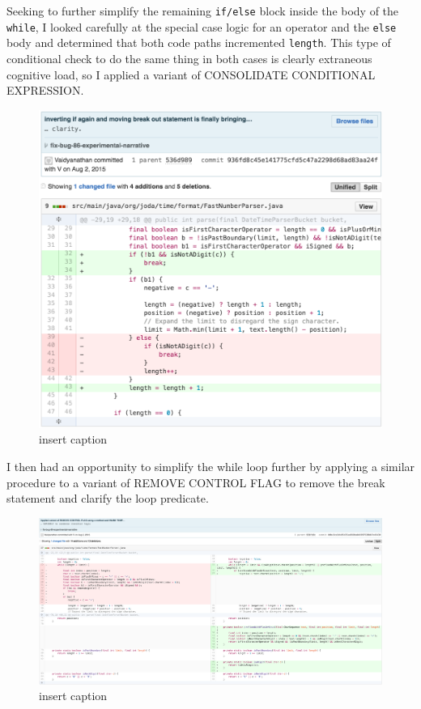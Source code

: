 Seeking to further simplify the remaining \texttt{if/else} block inside the body of the \texttt{while}, I looked carefully at the special case logic for an operator and the \texttt{else} body and determined that both code paths incremented \texttt{length}. This type of conditional check to do the same thing in both cases is clearly extraneous cognitive load, so I applied a variant of CONSOLIDATE CONDITIONAL EXPRESSION.

\begin{figure}[H]
	\centering
	\includegraphics[width=\linewidth]{code16}
	\caption{insert caption}
\end{figure}

I then had an opportunity to simplify the while loop further by applying a similar procedure to a variant of REMOVE CONTROL FLAG to remove the break statement and clarify the loop predicate.

\begin{figure}[H]
	\centering
	\includegraphics[width=\linewidth]{code17}
	\caption{insert caption}
\end{figure}

